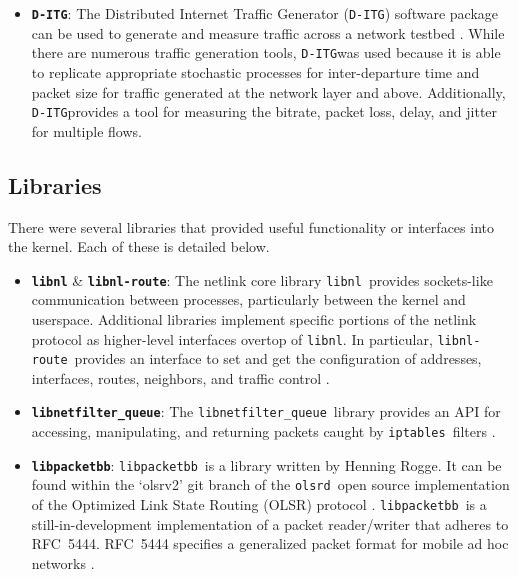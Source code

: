 \documentclass{article}
\newenvironment{myitemize}{
	\begin{itemize}
	\setlength{\itemsep}{1pt}
	\setlength{\parskip}{0pt}
	\setlength{\parsep}{0pt}}{\end{itemize}
	}
\newcommand{\ditg}{\texttt{D-ITG}}
\newcommand{\iptables}{\texttt{iptables}}
\newcommand{\libnetfilterqueue}{\texttt{libnetfilter\_queue}}
\newcommand{\libnlroute}{\texttt{libnl-route}}
\newcommand{\libnl}{\texttt{libnl}}
\newcommand{\libpacketbb}{\texttt{libpacketbb}}
\newcommand{\olsrd}{\texttt{olsrd}}
\begin{document}
\begin{myitemize}
\item \textbf{\ditg}:
  The Distributed Internet Traffic Generator (\ditg{}) software package can be used to generate and measure traffic across a network testbed \cite{d-itg}.
  While there are numerous traffic generation tools, \ditg was used because it is able to replicate appropriate stochastic processes for inter-departure time and packet size for traffic generated at the network layer and above.
  Additionally, \ditg provides a tool for measuring the bitrate, packet loss, delay, and jitter for multiple flows.

\end{myitemize}


\subsection{Libraries}\label{sec:libraries}

There were several libraries that provided useful functionality or interfaces into the kernel.
Each of these is detailed below.

\begin{myitemize}

\item \textbf{\libnl} \& \textbf{\libnlroute}: The netlink core library \libnl\ provides sockets-like communication
between processes, particularly between the kernel and userspace.
  Additional libraries implement specific portions of the netlink protocol as higher-level interfaces overtop of \libnl.
  In particular, \libnlroute\ provides an interface to set and get the configuration of addresses, interfaces, routes, neighbors, and traffic control \cite{libnl}.

\item \textbf{\libnetfilterqueue}: The \libnetfilterqueue\ library provides an API for accessing, manipulating, and
returning packets caught by \iptables\ filters \cite{libnfq}.

\item \textbf{\libpacketbb}: \libpacketbb\ is a library written by Henning Rogge.
  It can be found within the `olsrv2' git branch of the \olsrd\ open source implementation of the Optimized Link State Routing (OLSR) protocol \cite{olsrd}.
  \libpacketbb\ is a still-in-development implementation of a packet reader/writer that adheres to RFC~5444.
  RFC~5444 specifies a generalized packet format for mobile ad hoc networks \cite{packetbb-rfc}.

\end{myitemize}
\end{document}
